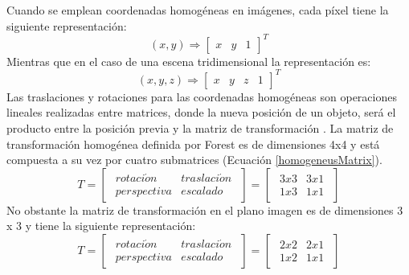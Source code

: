 Cuando se emplean coordenadas homogéneas en imágenes, cada píxel tiene la siguiente representación:
\begin{equation}
(x, y) \Rightarrow
\begin{bmatrix}
x & y & 1
\end{bmatrix}^{T}
\end{equation}
Mientras que en el caso de una escena tridimensional la representación es:
\begin{equation}
(x, y, z) \Rightarrow
\begin{bmatrix}
x & y & z & 1
\end{bmatrix}^{T}
\end{equation}
Las traslaciones y rotaciones para las coordenadas homogéneas son operaciones lineales realizadas entre matrices, donde la nueva posición de un objeto, será el producto entre la posición previa y la matriz de transformación \cite{RSSFernando_homogeneusC}. La matriz de transformación homogénea definida por Forest es de dimensiones 4x4 y está compuesta a su vez por cuatro submatrices (Ecuación \eqref{homogeneusMatrix}).
\begin{equation}
    T = \begin{bmatrix}
        \begin{array}{c|c}
                rotaci\acute{o}n & traslaci\acute{o}n\\
                \hline
                perspectiva & escalado
        \end{array}
        \end{bmatrix}
        =
        \begin{bmatrix}
        \begin{array}{c|c}
                3 x 3 & 3 x 1\\
                \hline
                1 x 3 & 1 x 1
        \end{array}
        \end{bmatrix}
\label{homogeneusMatrix}
\end{equation}
No obstante la matriz de transformación en el plano imagen es de dimensiones 3 x 3 y tiene la siguiente representación:
\begin{equation}
    T = \begin{bmatrix}
        \begin{array}{c|c}
                rotaci\acute{o}n & traslaci\acute{o}n\\
                \hline
                perspectiva & escalado
        \end{array}
        \end{bmatrix}
        =
        \begin{bmatrix}
        \begin{array}{c|c}
                2 x 2 & 2 x 1\\
                \hline
                1 x 2 & 1 x 1
        \end{array}
        \end{bmatrix}
\end{equation}
